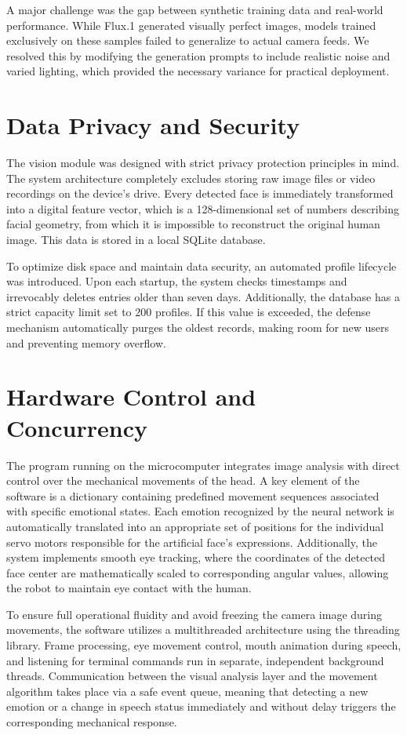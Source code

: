 \documentclass{article}
\begin{document}
A major challenge was the gap between synthetic training data and real-world performance. While Flux.1 generated visually perfect images, models trained exclusively on these samples failed to generalize to actual camera feeds. We resolved this by modifying the generation prompts to include realistic noise and varied lighting, which provided the necessary variance for practical deployment.

\section{Data Privacy and Security}
The vision module was designed with strict privacy protection principles in mind. The system architecture completely excludes storing raw image files or video recordings on the device's drive. Every detected face is immediately transformed into a digital feature vector, which is a 128-dimensional set of numbers describing facial geometry, from which it is impossible to reconstruct the original human image. This data is stored in a local SQLite database.

To optimize disk space and maintain data security, an automated profile lifecycle was introduced. Upon each startup, the system checks timestamps and irrevocably deletes entries older than seven days. Additionally, the database has a strict capacity limit set to 200 profiles. If this value is exceeded, the defense mechanism automatically purges the oldest records, making room for new users and preventing memory overflow.

\section{Hardware Control and Concurrency}
The program running on the microcomputer integrates image analysis with direct control over the mechanical movements of the head. A key element of the software is a dictionary containing predefined movement sequences associated with specific emotional states. Each emotion recognized by the neural network is automatically translated into an appropriate set of positions for the individual servo motors responsible for the artificial face's expressions. Additionally, the system implements smooth eye tracking, where the coordinates of the detected face center are mathematically scaled to corresponding angular values, allowing the robot to maintain eye contact with the human.

To ensure full operational fluidity and avoid freezing the camera image during movements, the software utilizes a multithreaded architecture using the threading library. Frame processing, eye movement control, mouth animation during speech, and listening for terminal commands run in separate, independent background threads. Communication between the visual analysis layer and the movement algorithm takes place via a safe event queue, meaning that detecting a new emotion or a change in speech status immediately and without delay triggers the corresponding mechanical response.
\end{document}

